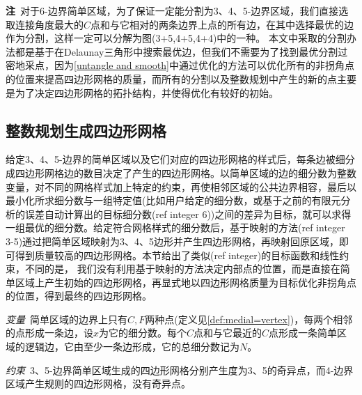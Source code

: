 \textbf{注}\, 对于6-边界简单区域，为了保证一定能分割为3、4、5-边界区域，我们直接选取连接角度最大的$C$点和与它相对的两条边界上点的所有边，在其中选择最优的边作为分割，这样一定可以分解为图(3+5,4+5,4+4)中的一种。
本文中采取的分割办法都是基于在Delaunay三角形中搜索最优边，但我们不需要为了找到最优分割过密地采点，因为\ref{untangle and smooth}中通过优化的方法可以优化所有的非拐角点的位置来提高四边形网格的质量，而所有的分割以及整数规划中产生的新的点主要是为了决定四边形网格的拓扑结构，并使得优化有较好的初始。
\subsection{整数规划生成四边形网格}\label{sec:quad-meshing}
给定3、4、5-边界的简单区域以及它们对应的四边形网格的样式后，每条边被细分成四边形网格边的数目决定了产生的四边形网格。以简单区域的边的细分数为整数变量，对不同的网格样式加上特定的约束，再使相邻区域的公共边界相容，最后以最小化所求细分数与一组特定值(比如用户给定的细分数，或基于之前的有限元分析的误差自动计算出的目标细分数(ref integer 6))之间的差异为目标，就可以求得一组最优的细分数。给定符合网格样式的细分数后，基于映射的方法(ref integer 3-5)通过把简单区域映射为3、4、5边形并产生四边形网格，再映射回原区域，即可得到质量较高的四边形网格。本节给出了类似(ref integer)的目标函数和线性约束，不同的是，
我们没有利用基于映射的方法决定内部点的位置，而是直接在简单区域上产生初始的四边形网格，再显式地以四边形网格质量为目标优化非拐角点的位置，得到最终的四边形网格。

\emph{变量}\, 简单区域的边界上只有$C,F$两种点(定义见\ref{def:medial=vertex})，每两个相邻的点形成一条边，设$x$为它的细分数。每个$C$点和与它最近的$C$点形成一条简单区域的逻辑边，它由至少一条边形成，它的总细分数记为$N$。

\emph{约束}\, 3、5-边界简单区域生成的四边形网格分别产生度为3、5的奇异点，而4-边界区域产生规则的四边形网格，没有奇异点。

